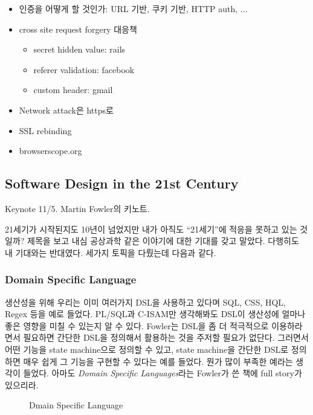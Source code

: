 \documentclass[11pt]{article}
\begin{document}
\begin{itemize}
\item 인증을 어떻게 할 것인가: URL 기반, 쿠키 기반, HTTP auth, ...
\item cross site request forgery 대응책
    \begin{itemize}
    \item secret hidden value: rails
    \item referer validation: facebook
    \item custom header: gmail
    \end{itemize}
\item Network  attack은 https로 
\item SSL rebinding
\item browserscope.org 
\end{itemize}
 
\subsection{Software Design in the 21st Century}

Keynote 11/5. Martin Fowler의 키노트.
 
21세기가 시작된지도 10년이 넘었지만 내가 아직도 ``21세기''에 적응을 못하고 
있는 것일까? 제목을 보고 내심 공상과학 같은 이야기에 대한 기대를 갖고 말았다.
다행히도 내 기대와는 반대였다. 세가지 토픽을 다뤘는데 다음과 같다.
 
\subsubsection{Domain Specific Language}
 
생산성을 위해 우리는 이미 여러가지 DSL을 사용하고 있다며 SQL, CSS, HQL, Regex 
등을 예로 들었다. PL/SQL과 C-ISAM만 생각해봐도 DSL이 생산성에 얼마나 좋은 
영향을 미칠 수 있는지 알 수 있다. Fowler는 DSL을 좀 더 적극적으로 
이용하라면서 필요하면 간단한 DSL을 정의해서 활용하는 것을 주저할 필요가 
없단다. 그러면서 어떤 기능을 state machine으로 정의할 수 있고, state 
machine을 간단한 DSL로 정의하면 매우 쉽게 그 기능을 구현할 수 있다는 예를 
들었다. 뭔가 많이 부족한 예라는 생각이 들었다.
아마도 \textit{Domain Specific Languages}\cite{fowler}라는 Fowler가 쓴 책에 
full story가 있으리라.

\begin{figure}[t]
    \begin{Frame}
        \begin{center}
        \end{center}
    \end{Frame}
    \caption{Dmain Specific Language}
    \label{dsl}
\end{figure}
 
\end{document}
